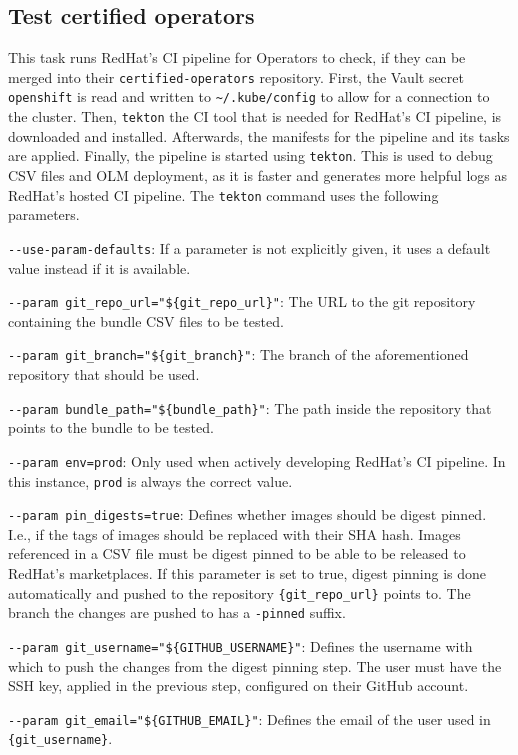 \subsection{Test certified operators}\label{subsec:test-certified-operators}

This task runs RedHat's CI pipeline for Operators to check, if they can be merged into their \verb|certified-operators| repository.
First, the Vault secret \verb|openshift| is read and written to \verb|~/.kube/config| to allow for a connection to the cluster.
Then, \verb|tekton| the CI tool that is needed for RedHat's CI pipeline, is downloaded and installed.
Afterwards, the manifests for the pipeline and its tasks are applied.
Finally, the pipeline is started using \verb|tekton|.
This is used to debug CSV files and OLM deployment, as it is faster and generates more helpful logs as RedHat's hosted CI pipeline.
The \verb|tekton| command uses the following parameters.

\verb|--use-param-defaults|: If a parameter is not explicitly given, it uses a default value instead if it is available.

\verb|--param git_repo_url="${git_repo_url}"|: The URL to the git repository containing the bundle CSV files to be tested.

\verb|--param git_branch="${git_branch}"|: The branch of the aforementioned repository that should be used.

\verb|--param bundle_path="${bundle_path}"|: The path inside the repository that points to the bundle to be tested.

\verb|--param env=prod|: Only used when actively developing RedHat's CI pipeline.
    In this instance, \verb|prod| is always the correct value.

\verb|--param pin_digests=true|: Defines whether images should be digest pinned.
    I.e., if the tags of images should be replaced with their SHA hash.
    Images referenced in a CSV file must be digest pinned to be able to be released to RedHat's marketplaces.
    If this parameter is set to true, digest pinning is done automatically and pushed to the repository \verb|{git_repo_url}| points to.
    The branch the changes are pushed to has a \verb|-pinned| suffix.

\verb|--param git_username="${GITHUB_USERNAME}"|: Defines the username with which to push the changes from the digest pinning step.
    The user must have the SSH key, applied in the previous step, configured on their GitHub account.

\verb|--param git_email="${GITHUB_EMAIL}"|: Defines the email of the user used in \verb|{git_username}|.

